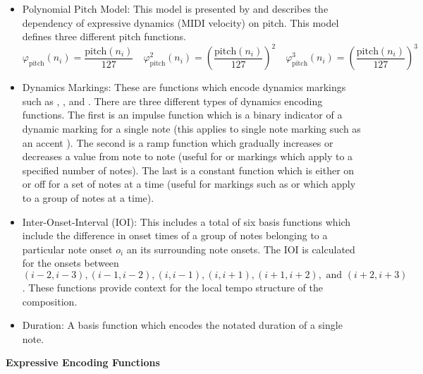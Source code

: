 \newcommand{\pfunc}[1]{\varphi_{\textrm{pitch}}^#1(n_i)}
\newcommand{\pfuncnorm}{\varphi_{\textrm{pitch}}(n_i)}
\newcommand{\midip}{\textrm{pitch}}
\begin{itemize}
    \item Polynomial Pitch Model: This model is presented by \citet{grachten2012linear} and describes the dependency of expressive dynamics (MIDI velocity) on pitch. This model defines three different pitch functions. $$\pfuncnorm{} = \frac{\midip (n_i)}{127} \quad \pfunc{2} = \left(\frac{\midip(n_i)}{127}\right)^2 \quad \pfunc{3} = \left(\frac{\midip (n_i)}{127}\right)^3$$
    \item Dynamics Markings: These are functions which encode dynamics markings such as , , and . There are three different types of dynamics encoding functions. The first is an impulse function  which is a binary indicator of a dynamic marking for a single note (this applies to single note marking such as an accent \wedge). The second is a ramp function which gradually increases or decreases a value from note to note (useful for  or  markings which apply to a specified number of notes). The last is a constant function which is either on or off for a set of notes at a time (useful for markings such as  or  which apply to a group of notes at a time). 
    \item Inter-Onset-Interval (IOI): This includes a total of six basis functions which include the difference in onset times of a group of notes belonging to a particular note onset $o_i$ an its surrounding note onsets. The IOI is calculated for the onsets between $(i - 2, i-3), (i-1, i-2), (i, i-1), (i, i+1), (i+1, i+2), \textrm{ and } (i+2, i+3)$. These functions provide context for the local tempo structure of the composition. 
    \item Duration: A basis function which encodes the notated duration of a single note. 
\end{itemize}

\textbf{Expressive Encoding Functions}

